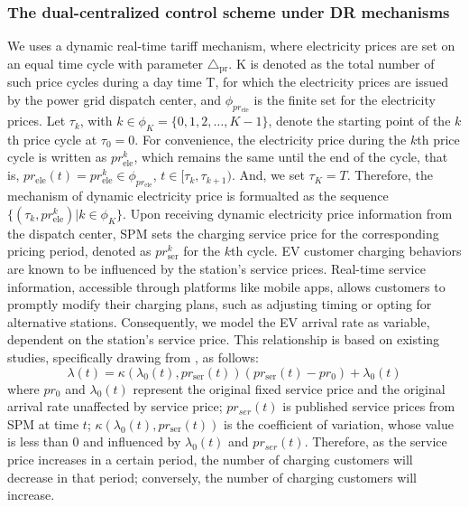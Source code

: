 \documentclass[preprint,12pt]{elsarticle}
\begin{document}
\subsubsection{The dual-centralized control scheme under DR mechanisms}
We uses a dynamic real-time tariff mechanism, where electricity prices are set on an equal time cycle with parameter $\triangle_{\textrm{pr}}$. K is denoted as the total number of such price cycles during a day time T, for which the electricity prices are issued by the power grid dispatch center, and $\phi_{pr_{\textrm{ele}}}$ is the finite set for the electricity prices. Let $\tau_{k}$, with $k\in\phi_{K}=\{0,1,2,\ldots,K-1\}$, denote the starting point of the $k$th price cycle at $\tau_{0}=0$. For convenience, the electricity price during the $k$th price cycle is written as $pr_{\textrm{ele}}^{k}$, which remains the same until the end of the cycle, that is, $pr_{\textrm{ele}}(t)=pr_{\textrm{ele}}^{k}\in\phi_{pr_{\textrm{ele}}}$, $t\in[\tau_{k},\tau_{k+1})$. And, we set $\tau_{K}=T$. Therefore, the mechanism of dynamic electricity price is formualted as the sequence $\{(\tau_{k},pr_{\textrm{ele}}^{k})|k\in\phi_{K}\}$. 
Upon receiving dynamic electricity price information from the dispatch center, SPM sets the charging service price for the corresponding pricing period, denoted as $ pr_{\textrm{ser}}^{k}$ for the $k$th cycle. EV customer charging behaviors are known to be influenced by the station's service prices. Real-time service information, accessible through platforms like mobile apps, allows customers to promptly modify their charging plans, such as adjusting timing or opting for alternative stations. Consequently, we model the EV arrival rate as variable, dependent on the station's service price. This relationship is based on existing studies, specifically drawing from \citep{bao_approach_2022}, as follows:
\begin{equation}
\lambda(t)=\kappa(\lambda_{0}(t),pr_{\textrm{ser}}(t))(pr_{\textrm{ser}}(t)-pr_{0})+\lambda_{0}(t)
\label{eq:lambda_price}
\end{equation}
where $pr_{0}$ and $\lambda_{0}(t)$ represent the original fixed service price and the original arrival rate unaffected by service price; $pr_{ser}(t)$ is published service prices from SPM at time $t$; $\kappa(\lambda_{0}(t),pr_{\textrm{ser}}(t))$ is the coefficient of variation, whose value is less than $0$ and influenced by $\lambda_{0}(t)$ and $pr_{ser}(t)$.
Therefore, as the service price increases in a certain period, the number of charging customers will decrease in that period; conversely, the number of charging customers will increase.
\end{document}
